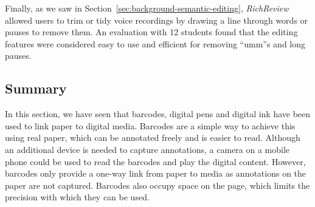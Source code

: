 


Finally, as we saw in Section~\ref{sec:background-semantic-editing}, \textit{RichReview} \citep{Yoon2014} allowed users
to trim or tidy voice recordings by drawing a line through words or pauses to remove them.  An evaluation with 12
students found that the editing features were considered easy to use and efficient for removing ``umm''s and long
pauses.

\subsection{Summary}
In this section, we have seen that barcodes, digital pens and digital ink have been used to link paper to digital
media.  Barcodes are a simple way to achieve this using real paper, which can be annotated freely and is easier to
read.  Although an additional device is needed to capture annotations, a camera on a mobile phone could be used to read
the barcodes and play the digital content.  However, barcodes only provide a one-way link from paper to media as
annotations on the paper are not captured.  Barcodes also occupy space on the page, which limits the precision with
which they can be used.

